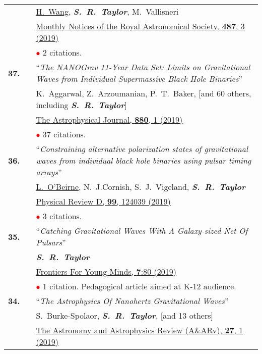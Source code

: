 \documentclass[11pt,letterpaper,sans]{moderncv}
\begin{document}
{\begin{longtable}{rp{0.3cm}p{15.8cm}}
&&\underline{H.~Wang}, \textit{\textbf{S.~R.~Taylor}}, M.~Vallisneri \\
&& \href{https://academic.oup.com/mnras/article/487/3/3644/5511287}{{\color{color1} Monthly Notices of the Royal Astronomical Society, \textbf{487}, 3 (2019)}} \\
&& \textcolor{red}{$\bullet$} $2$ citations. \vspace{0.09cm}\\
\textbf{37.} & & ``\textit{The NANOGrav 11-Year Data Set: Limits on Gravitational Waves from Individual Supermassive Black Hole Binaries}'' \\ 
&&K.~Aggarwal, Z.~Arzoumanian, P.~T.~Baker, [and 60 others, including \textit{\textbf{S.~R.~Taylor}}] \\
&& \href{https://iopscience.iop.org/article/10.3847/1538-4357/ab2236}{{\color{color1} The Astrophysical Journal, \textbf{880}, 1 (2019)}} \\
&& \textcolor{red}{$\bullet$} $37$ citations. \vspace{0.09cm}\\
\textbf{36.} & & ``\textit{Constraining alternative polarization states of gravitational waves from individual black hole binaries using pulsar timing arrays}'' \\ 
&&\underline{L.~O'Beirne}, N.~J.Cornish, S.~J.~Vigeland, \textit{\textbf{S.~R.~Taylor}} \\
&& \href{https://journals.aps.org/prd/abstract/10.1103/PhysRevD.99.124039}{{\color{color1} Physical Review D, \textbf{99}, 124039 (2019)}} \\
&& \textcolor{red}{$\bullet$} $3$ citations. \vspace{0.09cm}\\
\textbf{35.} & & ``\textit{Catching Gravitational Waves With A Galaxy-sized Net Of Pulsars}'' \\ 
&&\textit{\textbf{S.~R.~Taylor}}\\
&& \href{https://kids.frontiersin.org/article/10.3389/frym.2019.00080}{{\color{color1} Frontiers For Young Minds, \textbf{7}:80 (2019)}} \\
&& \textcolor{red}{$\bullet$} $1$ citation. Pedagogical article aimed at K-12 audience. \vspace{0.09cm}\\
\textbf{34.} & & ``\textit{The Astrophysics Of Nanohertz Gravitational Waves}'' \\ 
&&S.~Burke-Spolaor, \textit{\textbf{S.~R.~Taylor}}, [and 13 others] \\
&& \href{https://arxiv.org/abs/1811.08826}{{\color{color1} The Astronomy and Astrophysics Review (A\&ARv), \textbf{27}, 1 (2019)}} \\

\end{longtable}}
\end{document}
